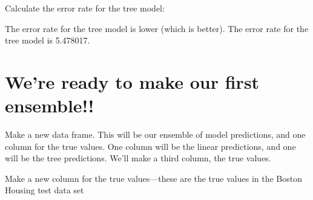 \documentclass[
]{book}
\newenvironment{Shaded}{\begin{snugshade}}{\end{snugshade}}
\newcommand{\AttributeTok}[1]{\textcolor[rgb]{0.13,0.29,0.53}{#1}}
\newcommand{\CommentTok}[1]{\textcolor[rgb]{0.56,0.35,0.01}{\textit{#1}}}
\newcommand{\FunctionTok}[1]{\textcolor[rgb]{0.13,0.29,0.53}{\textbf{#1}}}
\newcommand{\NormalTok}[1]{#1}
\newcommand{\OtherTok}[1]{\textcolor[rgb]{0.56,0.35,0.01}{#1}}
\newcommand{\SpecialCharTok}[1]{\textcolor[rgb]{0.81,0.36,0.00}{\textbf{#1}}}
\newcommand{\StringTok}[1]{\textcolor[rgb]{0.31,0.60,0.02}{#1}}
\begin{document}
Calculate the error rate for the tree model:

\begin{Shaded}
\end{Shaded}

The error rate for the tree model is lower (which is better). The error
rate for the tree model is 5.478017.

\section{We're ready to make our first ensemble!!}\label{were-ready-to-make-our-first-ensemble}

Make a new data frame. This will be our ensemble of model predictions,
and one column for the true values. One column will be the linear
predictions, and one will be the tree predictions. We'll make a third
column, the true values.

Make a new column for the true values---these are the true values in the
Boston Housing test data set

\begin{Shaded}
\end{Shaded}
\end{document}
